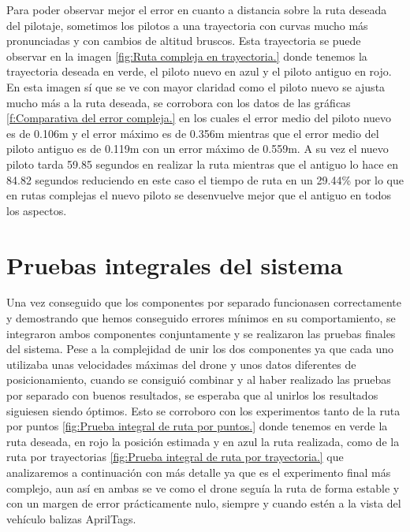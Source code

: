 \hspace{1cm} Para poder observar mejor el error en cuanto a distancia sobre la ruta deseada del pilotaje, sometimos los pilotos a una trayectoria con curvas mucho más pronunciadas y con cambios de altitud bruscos. Esta trayectoria se puede observar en la imagen \ref{fig:Ruta compleja en trayectoria.} donde tenemos la trayectoria deseada en verde, el piloto nuevo en azul y el piloto antiguo en rojo. En esta imagen sí que se ve con mayor claridad como el piloto nuevo se ajusta mucho más a la ruta deseada, se corrobora con los datos de las gráficas \ref{f:Comparativa del error compleja.} en los cuales el error medio del piloto nuevo es de 0.106m y el error máximo es de 0.356m mientras que el error medio del piloto antiguo es de 0.119m con un error máximo de 0.559m. A su vez el nuevo piloto tarda 59.85 segundos en realizar la ruta mientras que el antiguo lo hace en 84.82 segundos reduciendo en este caso el tiempo de ruta en un 29.44\% por lo que en rutas complejas el nuevo piloto se desenvuelve mejor que el antiguo en todos los aspectos.

\section{Pruebas integrales del sistema}
\hspace{1cm} Una vez conseguido que los componentes por separado funcionasen correctamente y demostrando que hemos conseguido errores mínimos en su comportamiento, se integraron ambos componentes conjuntamente y se realizaron las pruebas finales del sistema. Pese a la complejidad de unir los dos componentes ya que cada uno utilizaba unas velocidades máximas del drone y unos datos diferentes de posicionamiento, cuando se consiguió combinar y al haber realizado las pruebas por separado con buenos resultados, se esperaba que al unirlos los resultados siguiesen siendo óptimos. Esto se corroboro con los experimentos tanto de la ruta por puntos \ref{fig:Prueba integral de ruta por puntos.} donde tenemos en verde la ruta deseada, en rojo la posición estimada y en azul la ruta realizada, como de la ruta por trayectorias \ref{fig:Prueba integral de ruta por trayectoria.} que analizaremos a continuación con más detalle ya que es el experimento final más complejo, aun así en ambas se ve como el drone seguía la ruta de forma estable y con un margen de error prácticamente nulo, siempre y cuando estén a la vista del vehículo balizas AprilTags. 

